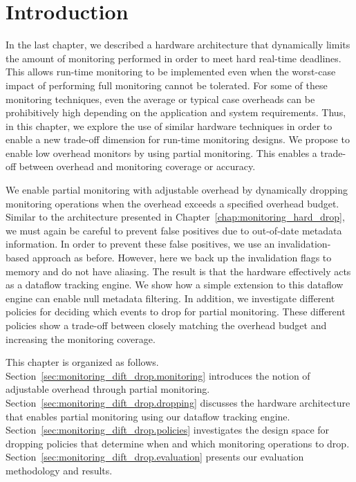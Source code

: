 \section{Introduction}
\label{sec:monitoring_dift_drop.introduction}

In the last chapter, we described a hardware architecture that dynamically
limits the amount of monitoring performed in order to meet hard real-time
deadlines. This allows run-time monitoring to be implemented even when the
worst-case impact of performing full monitoring cannot be tolerated. 
For some of these monitoring techniques, even the average or typical case
overheads can be prohibitively high depending on the application and system
requirements.  Thus, in this chapter, we explore the use of similar hardware
techniques in order to enable a new trade-off dimension for run-time monitoring
designs.  We propose to enable low overhead monitors by using partial
monitoring. This enables a trade-off between overhead and
monitoring coverage or accuracy. 

We enable partial monitoring with adjustable overhead by dynamically dropping
monitoring operations when the overhead exceeds a specified overhead budget.
Similar to the architecture presented in
Chapter~\ref{chap:monitoring_hard_drop}, we must again be careful to prevent
false positives due to out-of-date metadata information. In order to prevent
these false positives, we use an invalidation-based approach as before.
However, here we back up the invalidation flags to memory and do not have
aliasing. The result is that the hardware effectively acts as a dataflow
tracking engine. We show how a simple extension to this dataflow engine can
enable null metadata filtering. In addition, we investigate different policies
for deciding which events to drop for partial monitoring.  These different
policies show a trade-off between closely matching the overhead budget and
increasing the monitoring coverage.

This chapter is organized as follows.
Section~\ref{sec:monitoring_dift_drop.monitoring} introduces the notion of
adjustable overhead through partial monitoring.
Section~\ref{sec:monitoring_dift_drop.dropping} discusses the hardware
architecture that enables partial monitoring using our dataflow tracking
engine.  Section~\ref{sec:monitoring_dift_drop.policies} investigates the
design space for dropping policies that determine when and which monitoring
operations to drop.  Section~\ref{sec:monitoring_dift_drop.evaluation} presents
our evaluation methodology and results. 

